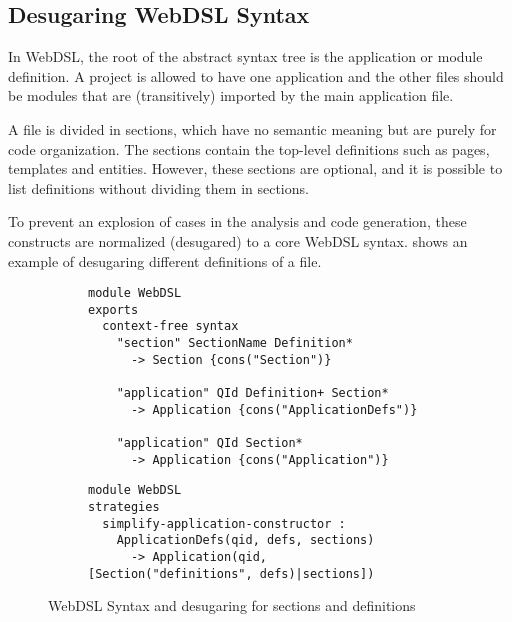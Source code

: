     \subsection{Desugaring WebDSL Syntax}

      In WebDSL, the root of the abstract syntax tree is the application or module definition. A project is allowed to have one application and the other files should be modules that are (transitively) imported by the main application file.

      A file is divided in sections, which have no semantic meaning but are purely for code organization. The sections contain the top-level definitions such as pages, templates and entities. However, these sections are optional, and it is possible to list definitions without dividing them in sections.

      To prevent an explosion of cases in the analysis and code generation, these constructs are normalized (desugared) to a core WebDSL syntax.  shows an example of desugaring different definitions of a file. 

      \begin{figure}
        \begin{subfigure}[b]{1\textwidth}
          \begin{verbatim}
module WebDSL
exports
  context-free syntax
    "section" SectionName Definition*
      -> Section {cons("Section")}
    
    "application" QId Definition+ Section* 
      -> Application {cons("ApplicationDefs")}
    
    "application" QId Section*
      -> Application {cons("Application")}
          \end{verbatim}
          \caption{\label{fig:sdf2-sections-sdf}}
        \end{subfigure}
        \begin{subfigure}[b]{1\textwidth}
          \begin{verbatim}
module WebDSL
strategies
  simplify-application-constructor :
    ApplicationDefs(qid, defs, sections)
      -> Application(qid, [Section("definitions", defs)|sections])
          \end{verbatim}
          \caption{\label{fig:sdf2-sections-stratego}}
        \end{subfigure}
        \caption{\label{fig:sdf2-sections}WebDSL Syntax and desugaring for sections and definitions}
      \end{figure}

